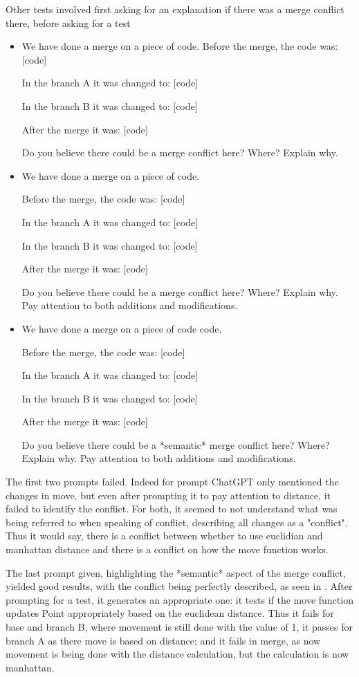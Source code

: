 Other tests involved first asking for an explanation if there was a merge conflict there, before asking for a test

\begin{itemize}
  \item We have done a merge on a piece of code.
Before the merge, the code was: [code]

In the branch A it was changed to: [code]

In the branch B it was changed to: [code]

After the merge it was: [code]

Do you believe there could be a merge conflict here? Where? Explain why.
  \item We have done a merge on a piece of code.
  
Before the merge, the code was: [code]

In the branch A it was changed to: [code]

In the branch B it was changed to: [code]

After the merge it was: [code]

Do you believe there could be a merge conflict here? Where? Explain why. Pay attention to both additions and modifications.
  \item We have done a merge on a piece of code code.
  
Before the merge, the code was: [code]

In the branch A it was changed to: [code]

In the branch B it was changed to: [code]

After the merge it was: [code]

Do you believe there could be a *semantic* merge conflict here? Where? Explain why. Pay attention to both additions and modifications.

\end{itemize}

The first two prompts failed. Indeed for prompt ChatGPT only mentioned the changes in move, but even after prompting it to pay attention to distance, it failed to identify the conflict. For both, it seemed to not understand what was being referred to when speaking of conflict, describing all changes as a "conflict". Thus it would say, there is a conflict between whether to use euclidian and manhattan distance and there is a conflict on how the move function works.

The last prompt given, highlighting the *semantic* aspect of the merge conflict, yielded good results, with the conflict being perfectly described, as seen in . After prompting for a test, it generates an appropriate one: it tests if the move function updates Point appropriately based on the euclidean distance. Thus it fails for base and branch B, where movement is still done with the value of 1, it passes for branch A as there move is based on distance; and it fails in merge, as now movement is being done with the distance calculation, but the calculation is now manhattan.

